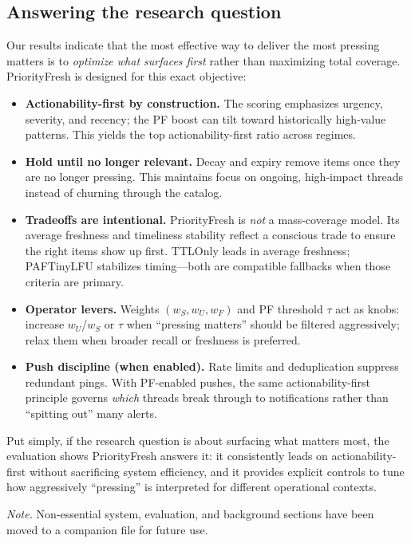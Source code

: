 \documentclass[11pt,twocolumn]{article}
\begin{document}
\subsection{Answering the research question}
\label{sec:rq-answer}
Our results indicate that the most effective way to deliver the most pressing matters is to \emph{optimize what surfaces first} rather than maximizing total coverage. PriorityFresh is designed for this exact objective:
\begin{itemize}
    \item \textbf{Actionability-first by construction.} The scoring emphasizes urgency, severity, and recency; the PF boost can tilt toward historically high-value patterns. This yields the top actionability-first ratio across regimes.
    \item \textbf{Hold until no longer relevant.} Decay and expiry remove items once they are no longer pressing. This maintains focus on ongoing, high-impact threads instead of churning through the catalog.
    \item \textbf{Tradeoffs are intentional.} PriorityFresh is \emph{not} a mass-coverage model. Its average freshness and timeliness stability reflect a conscious trade to ensure the right items show up first. TTLOnly leads in average freshness; PAFTinyLFU stabilizes timing—both are compatible fallbacks when those criteria are primary.
    \item \textbf{Operator levers.} Weights $(w_S,w_U,w_F)$ and PF threshold $\tau$ act as knobs: increase $w_U$/$w_S$ or $\tau$ when “pressing matters” should be filtered aggressively; relax them when broader recall or freshness is preferred.
    \item \textbf{Push discipline (when enabled).} Rate limits and deduplication suppress redundant pings. With PF-enabled pushes, the same actionability-first principle governs \emph{which} threads break through to notifications rather than “spitting out” many alerts.
\end{itemize}

Put simply, if the research question is about surfacing what matters most, the evaluation shows PriorityFresh answers it: it consistently leads on actionability-first without sacrificing system efficiency, and it provides explicit controls to tune how aggressively “pressing” is interpreted for different operational contexts.

\vspace{0.2cm}
\noindent\textit{Note.} Non-essential system, evaluation, and background sections have been moved to a companion file for future use.

\FloatBarrier
\clearpage

\end{document}
